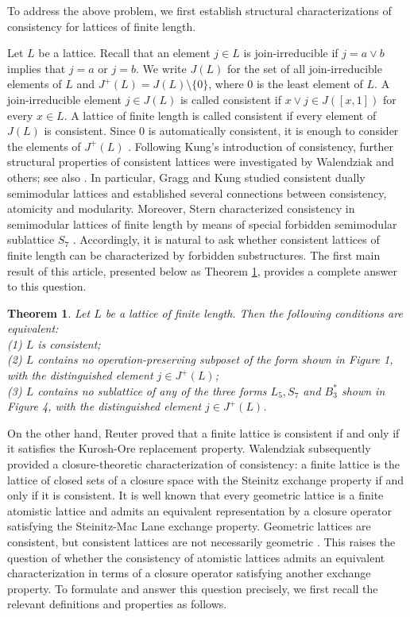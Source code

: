 \documentclass[12pt]{article}
\newtheorem{theorem}{\bf Theorem}[section]
\begin{document}
To address the above problem,  we first establish structural characterizations of consistency for lattices of finite length. 

Let $L$ be a lattice. Recall that an element $j\in L$ is join-irreducible 
if $j=a\vee b$ implies that $j=a$ or $j=b$. We write  $J(L)$ for the 
set of all join-irreducible elements of $L$ and $J^{+}(L)=J(L)\setminus\{0\}$, where $0$ is the least element of $L$. 
A join-irreducible element $j\in J(L)$ is called consistent if $x\vee j\in J([x,1])$ for every $x\in L$. 
A lattice of finite length is 
called consistent if every element of $J(L)$ is consistent. Since $0$ 
is automatically consistent, it is enough to consider the elements 
of $J^{+}(L)$ \cite{Stern99}. Following Kung's introduction of consistency, 
further structural properties of consistent lattices were investigated by Walendziak \cite{Walendziak94, Walendziak95} and others; 
see also \cite{Stern99}. In particular, Gragg and Kung \cite{Gragg} 
studied consistent dually semimodular lattices and established several 
connections between consistency, atomicity and modularity. 
Moreover, Stern characterized consistency in semimodular 
lattices of finite length by means of special forbidden semimodular 
sublattice $S_7$ \cite[Theorem 6.5.1]{Stern99}. 
Accordingly, it is natural to ask whether consistent lattices of finite 
length can be characterized by forbidden substructures. 
The first main result of this article, presented below 
as Theorem \ref{TT01}, provides a complete answer to this question.
\begin{theorem}\label{TT01}
Let $L$ be a lattice of finite length. Then the following conditions are equivalent:\\
(1) $L$ is consistent;\\
(2) $L$ contains no operation-preserving subposet of the form shown in Figure 1, with the distinguished element $j\in J^{+}(L)$; \\
(3) $L$ contains no sublattice of any of the three 
forms $L_5, S_7$ and $B^{*}_{3}$ shown in Figure 4, 
with the distinguished element $j\in J^{+}(L)$.   
\end{theorem}

On the other hand, Reuter \cite{Reuter} proved that a finite lattice 
is consistent if and only if it satisfies the Kurosh-Ore 
replacement property. Walendziak \cite{Walendziak95} subsequently 
provided a closure-theoretic characterization of consistency: 
a finite lattice is the lattice of closed sets of a closure 
space with the Steinitz exchange property if and only if 
it is consistent. It is well known that every geometric lattice 
is a finite atomistic lattice and admits an equivalent representation 
by a closure operator satisfying the Steinitz-Mac Lane exchange property. 
Geometric lattices are consistent, but consistent lattices are not 
necessarily geometric \cite{Stern99}. This raises the question of 
whether the consistency of atomistic lattices admits an equivalent 
characterization in terms of a closure operator satisfying 
another exchange property. To formulate and answer this question precisely, 
we first recall the relevant definitions and properties as follows. 
\end{document}
